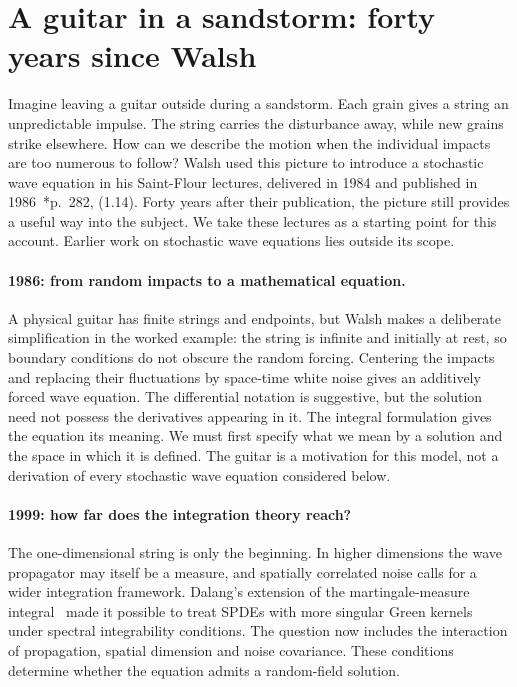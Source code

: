 \Needspace{0.44\textheight}
\section{A guitar in a sandstorm: forty years since Walsh}\label{S:wave-history}



Imagine leaving a guitar outside during a sandstorm. Each grain gives a string
an unpredictable impulse. The string carries the disturbance away, while new
grains strike elsewhere. How can we describe the motion when the individual
impacts are too numerous to follow? Walsh used this picture to introduce a
stochastic wave equation in his Saint-Flour lectures, delivered in 1984 and
published in 1986~\cite{walsh:86:introduction}*{p.~282, (1.14)}. Forty years
after their publication, the picture still provides a useful way into the
subject. We take these lectures as a starting point for this account. Earlier
work on stochastic wave equations lies outside its scope.

\paragraph{1986: from random impacts to a mathematical equation.}
A physical guitar has finite strings and endpoints, but Walsh makes a deliberate
simplification in the worked example: the string is infinite and initially at
rest, so boundary conditions do not obscure the random forcing. Centering the
impacts and replacing their fluctuations by space-time white noise gives an
additively forced wave equation. The differential notation is suggestive, but
the solution need not possess the derivatives appearing in it. The integral
formulation gives the equation its meaning. We must first specify what we mean
by a solution and the space in which it is defined. The guitar is a motivation
for this model, not a derivation of every stochastic wave equation considered
below.

\paragraph{1999: how far does the integration theory reach?}
The one-dimensional string is only the beginning. In higher dimensions the wave
propagator may itself be a measure, and spatially correlated noise calls for a
wider integration framework. Dalang's extension of the martingale-measure
integral~\cite{dalang:99:extending} made it possible to treat SPDEs with more
singular Green kernels under spectral integrability conditions. The question now
includes the interaction of propagation, spatial dimension and noise covariance.
These conditions determine whether the equation admits a random-field solution.

